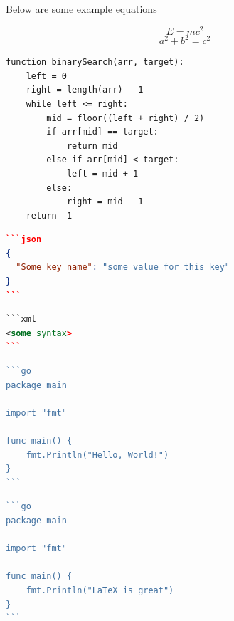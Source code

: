 
Below are some example equations

\begin{equation}
    E = mc^2
\end{equation}
\begin{equation}
    a^2 + b^2 = c^2
\end{equation}
\vspace{24pt}

\begin{lstlisting}[language=pseudocode]
function binarySearch(arr, target):
    left = 0
    right = length(arr) - 1
    while left <= right:
        mid = floor((left + right) / 2)
        if arr[mid] == target:
            return mid
        else if arr[mid] < target:
            left = mid + 1
        else:
            right = mid - 1
    return -1
\end{lstlisting}
\vspace{24pt}

\begin{lstlisting}[language=json]
```json
{
  "Some key name": "some value for this key"
}
```
\end{lstlisting}
\begin{lstlisting}[language=xml]
```xml
<some syntax>
```
\end{lstlisting}

\begin{lstlisting}[language=go]
```go
package main

import "fmt"

func main() {
    fmt.Println("Hello, World!")
}
```
\end{lstlisting}


\begin{lstlisting}[language=go]
```go
package main

import "fmt"

func main() {
    fmt.Println("LaTeX is great")
}
```
\end{lstlisting}

